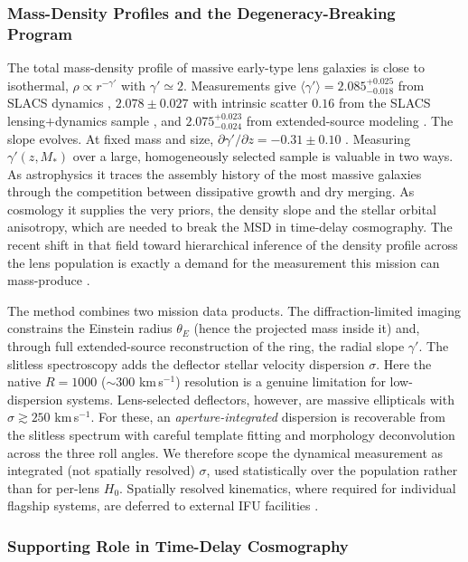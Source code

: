 \documentclass[10pt,onecolumn]{article}
\newcommand{\kms}{km\,s$^{-1}$}
\begin{document}
\subsubsection{Mass-Density Profiles and the Degeneracy-Breaking Program}

The total mass-density profile of massive early-type lens galaxies is close to isothermal, $\rho\propto r^{-\gamma'}$ with $\gamma'\simeq2$. Measurements give $\langle\gamma'\rangle=2.085^{+0.025}_{-0.018}$ from SLACS dynamics \cite{koopmans2009}, $2.078\pm0.027$ with intrinsic scatter $0.16$ from the SLACS lensing$+$dynamics sample \cite{auger2010}, and $2.075^{+0.023}_{-0.024}$ from extended-source modeling \cite{etherington2023}. The slope evolves. At fixed mass and size, $\partial\gamma'/\partial z=-0.31\pm0.10$ \cite{sonnenfeld2013}. Measuring $\gamma'(z,M_\ast)$ over a large, homogeneously selected sample is valuable in two ways. As astrophysics it traces the assembly history of the most massive galaxies through the competition between dissipative growth and dry merging. As cosmology it supplies the very priors, the density slope and the stellar orbital anisotropy, which are needed to break the MSD in time-delay cosmography. The recent shift in that field toward hierarchical inference of the density profile across the lens population is exactly a demand for the measurement this mission can mass-produce \cite{birrer2020}.

The method combines two mission data products. The diffraction-limited imaging constrains the Einstein radius $\theta_E$ (hence the projected mass inside it) and, through full extended-source reconstruction of the ring, the radial slope $\gamma'$. The slitless spectroscopy adds the deflector stellar velocity dispersion $\sigma$. Here the native $R=1000$ ($\sim$300 \kms) resolution is a genuine limitation for low-dispersion systems. Lens-selected deflectors, however, are massive ellipticals with $\sigma\gtrsim250$ \kms. For these, an \emph{aperture-integrated} dispersion is recoverable from the slitless spectrum with careful template fitting and morphology deconvolution across the three roll angles. We therefore scope the dynamical measurement as integrated (not spatially resolved) $\sigma$, used statistically over the population rather than for per-lens $H_0$. Spatially resolved kinematics, where required for individual flagship systems, are deferred to external IFU facilities \cite{tdcosmo2025}.

\subsubsection{Supporting Role in Time-Delay Cosmography}
\end{document}
